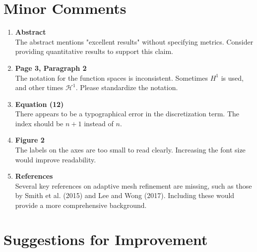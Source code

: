 \documentclass{article}
\begin{document}
\section*{Minor Comments}

\begin{enumerate}
    \item \textbf{Abstract} \\
    The abstract mentions "excellent results" without specifying metrics. Consider providing quantitative results to support this claim.

    \item \textbf{Page 3, Paragraph 2} \\
    The notation for the function spaces is inconsistent. Sometimes \( H^1 \) is used, and other times \( \mathcal{H}^1 \). Please standardize the notation.

    \item \textbf{Equation (12)} \\
    There appears to be a typographical error in the discretization term. The index should be \( n+1 \) instead of \( n \).

    \item \textbf{Figure 2} \\
    The labels on the axes are too small to read clearly. Increasing the font size would improve readability.

    \item \textbf{References} \\
    Several key references on adaptive mesh refinement are missing, such as those by Smith et al. (2015) and Lee and Wong (2017). Including these would provide a more comprehensive background.

\end{enumerate}

\section*{Suggestions for Improvement}
\end{document}
